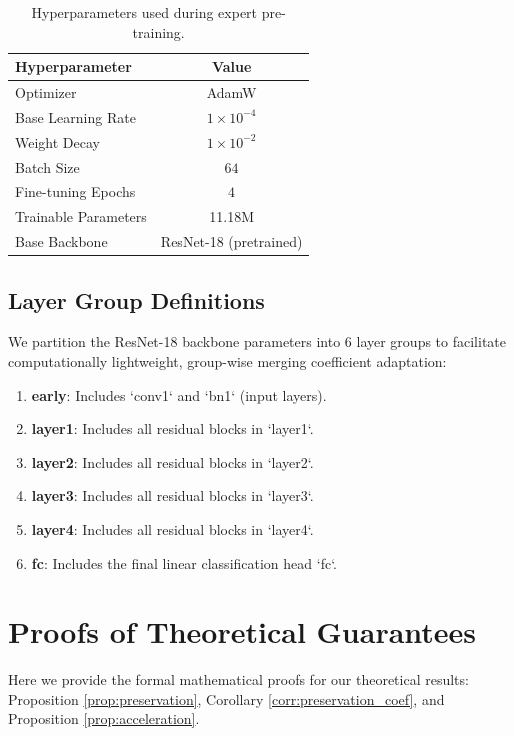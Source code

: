 \documentclass{article}
\theoremstyle{plain}
\theoremstyle{definition}
\theoremstyle{remark}
\begin{document}
\begin{table}[h]
\caption{Hyperparameters used during expert pre-training.}
\label{tab:hyperparams}
\vskip 0.15in
\begin{center}
\begin{small}
\begin{tabular}{lc}
\toprule
Hyperparameter & Value \\
\midrule
Optimizer & AdamW \\
Base Learning Rate & $1 \times 10^{-4}$ \\
Weight Decay & $1 \times 10^{-2}$ \\
Batch Size & $64$ \\
Fine-tuning Epochs & $4$ \\
Trainable Parameters & 11.18M \\
Base Backbone & ResNet-18 (pretrained) \\
\bottomrule
\end{tabular}
\end{small}
\end{center}
\end{table}

\subsection{Layer Group Definitions}
We partition the ResNet-18 backbone parameters into 6 layer groups to facilitate computationally lightweight, group-wise merging coefficient adaptation:
\begin{enumerate}
    \item \textbf{early}: Includes `conv1` and `bn1` (input layers).
    \item \textbf{layer1}: Includes all residual blocks in `layer1`.
    \item \textbf{layer2}: Includes all residual blocks in `layer2`.
    \item \textbf{layer3}: Includes all residual blocks in `layer3`.
    \item \textbf{layer4}: Includes all residual blocks in `layer4`.
    \item \textbf{fc}: Includes the final linear classification head `fc`.
\end{enumerate}

\section{Proofs of Theoretical Guarantees}\label{appendix:proof}
Here we provide the formal mathematical proofs for our theoretical results: Proposition \ref{prop:preservation}, Corollary \ref{corr:preservation_coef}, and Proposition \ref{prop:acceleration}.
\end{document}
